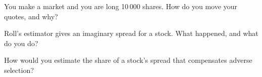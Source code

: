 \begin{interviewq}\label{iq:mx:why-there-is-a-spread:4}
You make a market and you are long 10\,000 shares. How do you move your quotes, and why?
\end{interviewq}

\begin{interviewq}\label{iq:mx:why-there-is-a-spread:5}
Roll's estimator gives an imaginary spread for a stock. What happened, and what do you do?
\end{interviewq}

\begin{interviewq}\label{iq:mx:why-there-is-a-spread:6}
How would you estimate the share of a stock's spread that compensates adverse selection?
\end{interviewq}
